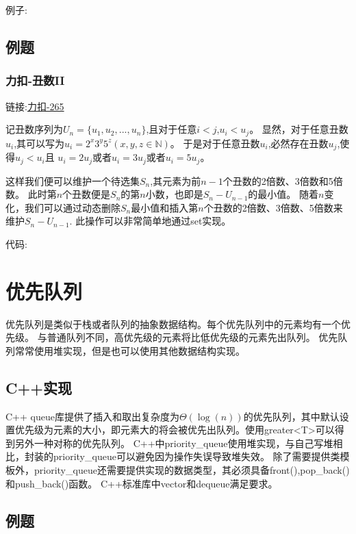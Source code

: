 \documentclass{article}
\begin{document}
    例子:
    

    \subsection{例题}
    \subsubsection{力扣-丑数II}
    链接:\href{https://leetcode.cn/problems/ugly-number-ii/submissions/411470687/}{力扣-265}
    
    记丑数序列为$U_n = \{u_1,u_2,...,u_n\}$,且对于任意$i<j$,$u_i<u_j$。
    显然，对于任意丑数$u_i$,其可以写为$u_i = 2^x3^y5^z(x,y,z\in \mathbb{N})$。
    于是对于任意丑数$u_i$,必然存在丑数$u_j$,使得$u_j<u_i$且
    $u_i = 2u_j$或者$u_i = 3u_j$或者$u_i = 5u_j$。

    这样我们便可以维护一个待选集$S_n$,其元素为前$n-1$个丑数的2倍数、3倍数和5倍数。
    此时第$n$个丑数便是$S_n$的第$n$小数，也即是$S_n - U_{n-1}$的最小值。
    随着$n$变化，我们可以通过动态删除$S_n$最小值和插入第$n$个丑数的2倍数、3倍数、5倍数来维护$S_n - U_{n-1}$.
    此操作可以非常简单地通过set实现。
    
    代码:
    

    \section{优先队列}
    优先队列是类似于栈或者队列的抽象数据结构。每个优先队列中的元素均有一个优先级。
    与普通队列不同，高优先级的元素将比低优先级的元素先出队列。
    优先队列常常使用堆实现，但是也可以使用其他数据结构实现。

    \subsection{C++实现}
    C++ queue库提供了插入和取出复杂度为$\Theta(\log(n))$的优先队列，其中默认设置优先级为元素的大小，即元素大的将会被优先出队列。使用greater<T>可以得到另外一种对称的优先队列。
    C++中priority\_queue使用堆实现，与自己写堆相比，封装的priority\_queue可以避免因为操作失误导致堆失效。
    除了需要提供类模板外，priority\_queue还需要提供实现的数据类型，其必须具备front(),pop\_back()和push\_back()函数。
    C++标准库中vector和dequeue满足要求。

    \subsection{例题}
\end{document}
